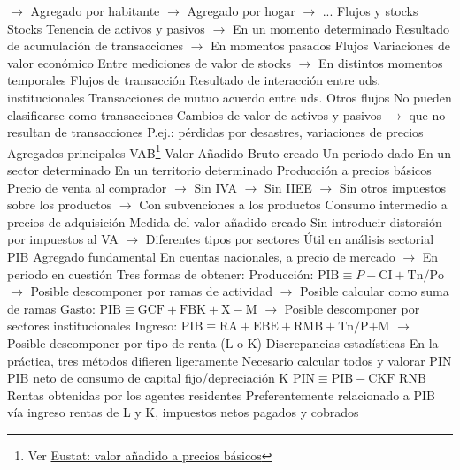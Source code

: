 \documentclass{nuevotema}
\begin{document}
\begin{esquemal}
				\4[] $\to$ Agregado por habitante
				\4[] $\to$ Agregado por hogar
				\4[] $\to$ ...
		\2 Flujos y stocks
			\3 Stocks
				\4 Tenencia de activos y pasivos
				\4[] $\to$ En un momento determinado
				\4 Resultado de acumulación de transacciones
				\4[] $\to$ En momentos pasados
			\3 Flujos
				\4 Variaciones de valor económico
				\4[] Entre mediciones de valor de stocks
				\4[] $\to$ En distintos momentos temporales
				\4 Flujos de transacción
				\4[] Resultado de interacción entre uds. institucionales
				\4[] Transacciones de mutuo acuerdo entre uds.
				\4 Otros flujos
				\4[] No pueden clasificarse como transacciones
				\4[] Cambios de valor de activos y pasivos
				\4[] $\to$ que no resultan de transacciones
				\4[] P.ej.: pérdidas por desastres, variaciones de precios
		\2 Agregados principales
			\3 VAB\footnote{Ver \href{https://www.eustat.eus/documentos/opt_0/tema_155/elem_2531/definicion.html}{Eustat: valor añadido a precios básicos}}
				\4 Valor Añadido Bruto creado
				\4[] Un periodo dado
				\4[] En un sector determinado
				\4[] En un territorio determinado
				\4 Producción a precios básicos
				\4[] Precio de venta al comprador
				\4[] $\to$ Sin IVA
				\4[] $\to$ Sin IIEE
				\4[] $\to$ Sin otros impuestos sobre los productos
				\4[] $\to$ Con subvenciones a los productos
				\4[-] Consumo intermedio a precios de adquisición
				\4[=] Medida del valor añadido creado
				\4[] Sin introducir distorsión por impuestos al VA
				\4[] $\to$ Diferentes tipos por sectores
				\4 Útil en análisis sectorial
			\3 PIB
				\4 Agregado fundamental
				\4 En cuentas nacionales, a precio de mercado
				\4[] $\to$ En periodo en cuestión
				\4 Tres formas de obtener:
				\4[] Producción: $\text{PIB} \equiv P - \text{CI} + \text{Tn/Po}$
				\4[] $\to$ Posible descomponer por ramas de actividad
				\4[] $\to$ Posible calcular como suma de ramas
				\4[] Gasto: $\text{PIB} \equiv \text{GCF} + \text{FBK} + \text{X} - \text{M}$
				\4[] $\to$ Posible descomponer por sectores institucionales
				\4[] Ingreso: $\text{PIB} \equiv \text{RA} + \text{EBE} + \text{RMB} + \text{Tn/P+M}$
				\4[] $\to$ Posible descomponer por tipo de renta (L o K)
				\4 Discrepancias estadísticas
				\4[] En la práctica, tres métodos difieren ligeramente
				\4[] Necesario calcular todos y valorar
			\3 PIN
				\4 PIB neto de consumo de capital fijo/depreciación K
				\4[] $\text{PIN} \equiv \text{PIB} - \text{CKF}$
			\3 RNB
				\4 Rentas obtenidas por los agentes residentes
				\4[] Preferentemente relacionado a PIB vía ingreso
				\4[] rentas de L y K, impuestos netos pagados y cobrados

\end{esquemal}
\end{document}
